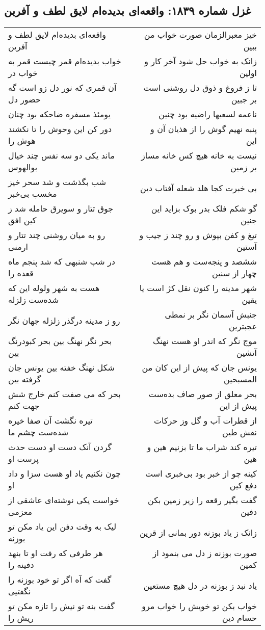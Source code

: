 \begin{center}
\section*{غزل شماره ۱۸۳۹: واقعه‌ای بدیده‌ام لایق لطف و آفرین}
\label{sec:1839}
\begin{longtable}{l p{0.5cm} r}
واقعه‌ای بدیده‌ام لایق لطف و آفرین
&&
خیز معبرالزمان صورت خواب من ببین
\\
خواب بدیده‌ام قمر چیست قمر به خواب در
&&
زانک به خواب حل شود آخر کار و اولین
\\
آن قمری که نور دل زو است گه حضور دل
&&
تا ز فروغ و ذوق دل روشنی است بر جبین
\\
یومئذ مسفره ضاحکه بود چنان
&&
ناعمه لسعیها راضیه بود چنین
\\
دور کن این وحوش را تا نکشند هوش را
&&
پنبه نهیم گوش را از هذیان آن و این
\\
ماند یکی دو سه نفس چند خیال بوالهوس
&&
نیست به خانه هیچ کس خانه مساز بر زمین
\\
شب بگذشت و شد سحر خیز مخسب بی‌خبر
&&
بی خبرت کجا هلد شعله آفتاب دین
\\
جوق تتار و سویرق حامله شد ز کین افق
&&
گو شکم فلک بدر بوک بزاید این جنین
\\
رو به میان روشنی چند تتار و ارمنی
&&
تیغ و کفن بپوش و رو چند ز جیب و آستین
\\
در شب شنبهی که شد پنجم ماه قعده را
&&
ششصد و پنجه‌ست و هم هست چهار از سنین
\\
هست به شهر ولوله این که شده‌ست زلزله
&&
شهر مدینه را کنون نقل کژ است یا یقین
\\
رو ز مدینه درگذر زلزله جهان نگر
&&
جنبش آسمان نگر بر نمطی عجبترین
\\
بحر نگر نهنگ بین بحر کبودرنگ بین
&&
موج نگر که اندر او هست نهنگ آتشین
\\
شکل نهنگ خفته بین یونس جان گرفته بین
&&
یونس جان که پیش از این کان من المسبحین
\\
بحر که می صفت کنم خارج شش جهت کنم
&&
بحر معلق از صور صاف بده‌ست پیش از این
\\
تیره نگشت آن صفا خیره شده‌ست چشم ما
&&
از قطرات آب و گل وز حرکات نقش طین
\\
گردن آنک دست او دست حدث پرست او
&&
تیره کند شراب ما تا بزنیم هین و هین
\\
چون نکنیم یاد او هست سزا و داد او
&&
کینه چو از خبر بود بی‌خبری است دفع کین
\\
خواست یکی نوشته‌ای عاشقی از معزمی
&&
گفت بگیر رقعه را زیر زمین بکن دفین
\\
لیک به وقت دفن این یاد مکن تو بوزنه
&&
زانک ز یاد بوزنه دور بمانی از قرین
\\
هر طرفی که رفت او تا بنهد دفینه را
&&
صورت بوزنه ز دل می بنمود از کمین
\\
گفت که آه اگر تو خود بوزنه را نگفتیی
&&
یاد نبد ز بوزنه در دل هیچ مستعین
\\
گفت بنه تو نیش را تازه مکن تو ریش را
&&
خواب بکن تو خویش را خواب مرو حسام دین
\\
\end{longtable}
\end{center}
